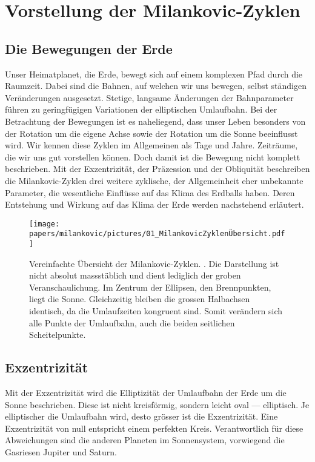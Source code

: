 %
%
%
%
\section{Vorstellung der Milankovic-Zyklen
\label{milankovic:section:VorstellungMIlankovic-Zyklen}}

\subsection{Die Bewegungen der Erde
\label{milankovic:subsection:BewegungenderErde}}
Unser Heimatplanet, die Erde, bewegt sich auf einem komplexen Pfad durch die Raumzeit.
Dabei sind die Bahnen, auf welchen wir uns bewegen, selbst ständigen Veränderungen ausgesetzt.
Stetige, langsame Änderungen der Bahnparameter führen zu geringfügigen Variationen der elliptischen Umlaufbahn.
Bei der Betrachtung der Bewegungen ist es naheliegend, dass unser Leben besonders von der Rotation um die eigene Achse sowie der Rotation um die Sonne beeinflusst wird.
Wir kennen diese Zyklen im Allgemeinen als Tage und Jahre.
Zeiträume, die wir uns gut vorstellen können.
Doch damit ist die Bewegung nicht komplett beschrieben.
Mit der Exzentrizität, der Präzession und der Obliquität beschreiben die Milankovic-Zyklen drei weitere zyklische, der Allgemeinheit eher unbekannte Parameter, die wesentliche Einflüsse auf das Klima des Erdballs haben.
Deren Entstehung und Wirkung auf das Klima der Erde werden nachstehend erläutert.

\begin{figure}
	\centering
	\texttt{[image: papers/milankovic/pictures/01\_MilankovicZyklenÜbersicht.pdf]}
	\caption{Vereinfachte Übersicht der Milankovic-Zyklen.
	\cite{milankovic:Übersicht-Milankovic-Zyklen}.
		Die Darstellung ist nicht absolut massstäblich und dient lediglich der groben Veranschaulichung. Im Zentrum der Ellipsen, den Brennpunkten, liegt die Sonne. Gleichzeitig bleiben die grossen Halbachsen identisch, da die Umlaufzeiten kongruent sind. Somit verändern sich alle Punkte der Umlaufbahn, auch die beiden seitlichen Scheitelpunkte. 
	\label{picture Übersicht Milankovic-Zyklen}}
\end{figure}

\subsection{Exzentrizität
\label{milankovic:subsection:Exzentrizität}}
Mit der Exzentrizität wird die Elliptizität der Umlaufbahn der Erde um die Sonne beschrieben.
Diese ist nicht kreisförmig, sondern leicht oval --- elliptisch.
Je elliptischer die Umlaufbahn wird, desto grösser ist die Exzentrizität.
Eine Exzentrizität von null entspricht einem perfekten Kreis.
Verantwortlich für diese Abweichungen sind die anderen Planeten im Sonnensystem, vorwiegend die Gasriesen Jupiter und Saturn.

